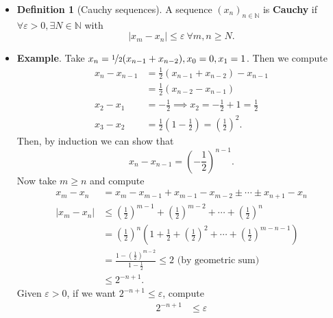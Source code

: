 \documentclass{article}
\newcommand{\N}{\mathbb{N}}
\newcommand{\seq}[2]{(#1_{#2})_{#2 \in \N}}
\newcommand{\?}{\stackrel{?}{=}}
\theoremstyle{definition} %
\newtheorem{definition}[subsection]{Definition} %
\begin{document}
\begin{itemize}
    \item[]
          \begin{definition}[Cauchy sequences]
              A sequence $\seq{x}{n}$ is \textbf{Cauchy} if $\forall \varepsilon > 0, \exists N \in \N$ with
              $$|x_m - x_n| \leq \varepsilon \ \forall m, n \geq N.$$
          \end{definition}
    \item \textbf{Example}. Take $x_n = \nicefrac{1}{2}(x_{n - 1} + x_{n - 2}), x_0 = 0, x_1 = 1$. Then we compute
          \begin{align*}
              x_n - x_{n - 1} & = \frac{1}{2}(x_{n - 1} + x_{n - 2}) - x_{n - 1}             \\
                              & = \frac{1}{2}(x_{n - 2} - x_{n - 1})                         \\
              x_2 - x_1       & = -\frac{1}{2} \implies x_2 = -\frac{1}{2} + 1 = \frac{1}{2} \\
              x_3 - x_2       & = \frac{1}{2}(1 - \frac{1}{2}) = \left(\frac{1}{2}\right)^2.
          \end{align*}
          Then, by induction we can show that
          $$x_n - x_{n - 1} = \left(-\frac{1}{2}\right)^{n - 1}.$$
          Now take $m \geq n$ and compute
          \begin{align*}
              x_m - x_n   & = x_m - x_{m - 1} + x_{m - 1} - x_{m - 2} \pm \cdots \pm x_{n + 1} - x_n                                                              \\
              |x_m - x_n| & \leq \left(\frac{1}{2}\right)^{m - 1} + \left(\frac{1}{2}\right)^{m - 2} + \cdots + \left(\frac{1}{2}\right)^n                        \\
                          & = \left(\frac{1}{2}\right)^n\left(1 + \frac{1}{2} + \left(\frac{1}{2}\right)^2 + \cdots + \left(\frac{1}{2}\right)^{m - n - 1}\right) \\
                          & = \frac{1 - \left(\frac{1}{2}\right)^{m - 2}}{1 - \frac{1}{2}} \leq 2 \text{ (by geometric sum)}                                      \\
                          & \leq 2^{-n + 1}.
          \end{align*}
          Given $\varepsilon > 0$, if we want $2^{-n + 1} \leq \varepsilon$, compute
          \begin{align*}
              2^{-n + 1} & \leq \varepsilon      \\

\end{align*}
\end{itemize}
\end{document}
